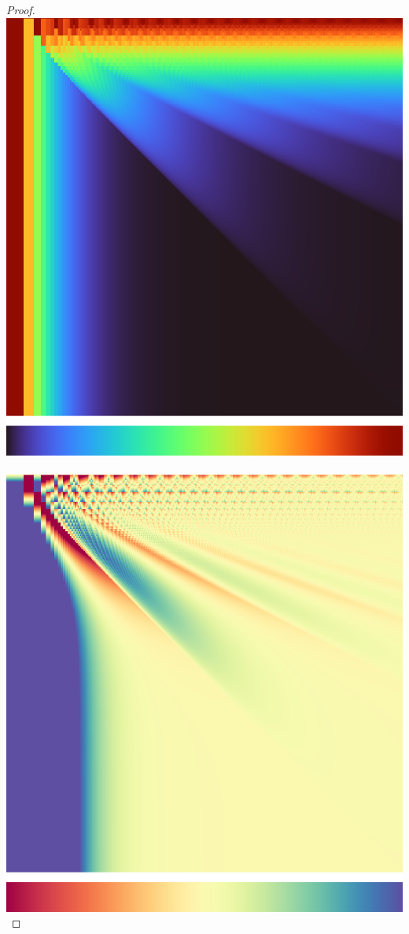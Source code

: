 \documentclass[]{article}
\begin{document}
\begin{proof}
	\includegraphics[scale=0.3]{w.png}\,\includegraphics[scale=0.3]{bias.png}


\end{proof}
\end{document}
